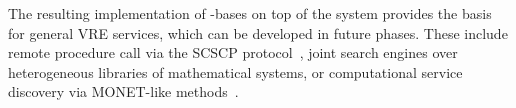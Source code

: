 The resulting implementation of \DKS-bases on top of the \MMT system provides the basis for general VRE services, which can be developed in future \pn phases.
These include remote procedure call via the SCSCP protocol~\cite{SCSCP,FHKLR:SCSCP08,HorRoz:ossp09}, joint search engines over heterogeneous libraries of mathematical systems, or computational service discovery via MONET-like methods~\cite{aird-et-al:2005}.



